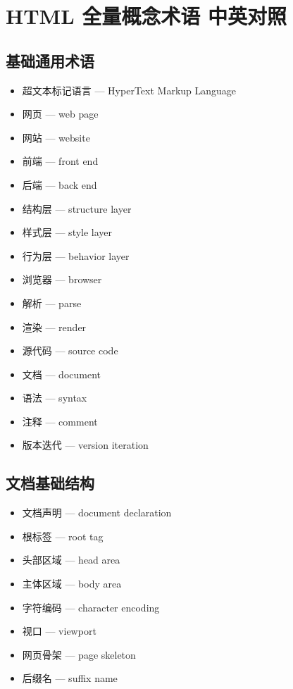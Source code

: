 
\section{HTML 全量概念术语 中英对照}

\subsection{基础通用术语}
\begin{itemize}
\item 超文本标记语言 — HyperText Markup Language
\item 网页 — web page
\item 网站 — website
\item 前端 — front end
\item 后端 — back end
\item 结构层 — structure layer
\item 样式层 — style layer
\item 行为层 — behavior layer
\item 浏览器 — browser
\item 解析 — parse
\item 渲染 — render
\item 源代码 — source code
\item 文档 — document
\item 语法 — syntax
\item 注释 — comment
\item 版本迭代 — version iteration
\end{itemize}

\subsection{文档基础结构}
\begin{itemize}
\item 文档声明 — document declaration
\item 根标签 — root tag
\item 头部区域 — head area
\item 主体区域 — body area
\item 字符编码 — character encoding
\item 视口 — viewport
\item 网页骨架 — page skeleton
\item 后缀名 — suffix name
\end{itemize}

